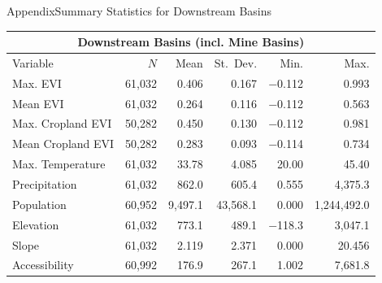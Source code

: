 \documentclass[aspectratio=169,11pt,dvipsnames, handout]{beamer}
\begin{document}
\begin{frame}{\textcolor{defaultclr!30}{Appendix}\hspace{0.75em}Summary Statistics for Downstream Basins}
    \centering
\begin{tabular}{@{\extracolsep{5pt}}lrrrrr} 
\toprule 
\multicolumn{6}{c}{Downstream Basins (incl. Mine Basins)} \\ \midrule
Variable & $N$ & Mean & St.~Dev. & Min. & Max. \\ \midrule
Max. EVI & 61,032 & 0.406 & 0.167 & $-$0.112 & 0.993 \\ 
Mean EVI & 61,032 & 0.264 & 0.116 & $-$0.112 & 0.563 \\ 
Max. Cropland EVI & 50,282 & 0.450 & 0.130 & $-$0.112 & 0.981 \\ 
Mean Cropland EVI & 50,282 & 0.283 & 0.093 & $-$0.114 & 0.734 \\ 
Max. Temperature & 61,032 & 33.78 & 4.085 & 20.00 & 45.40 \\ 
Precipitation & 61,032 & 862.0 & 605.4 & 0.555 & 4,375.3 \\ 
Population & 60,952 & 9,497.1 & 43,568.1 & 0.000 & 1,244,492.0 \\ 
Elevation & 61,032 & 773.1 & 489.1 & $-$118.3 & 3,047.1 \\ 
Slope & 61,032 & 2.119 & 2.371 & 0.000 & 20.456 \\ 
Accessibility & 60,992 & 176.9 & 267.1 & 1.002 & 7,681.8 \\ 
\bottomrule
\end{tabular} 

\vspace{0.5em}

 \hyperlink{frame:covars}{} \hyperlink{frame:sumstats}{}
\end{frame}

\end{document}

